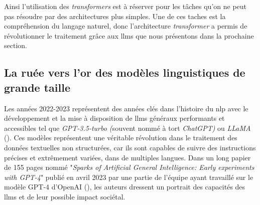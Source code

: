Ainsi l'utilisation des \textit{transformers} est à réserver pour les tâches qu'on ne peut pas résoudre par des architectures plus simples. Une de ces taches est la compréhension du langage naturel, donc l'architecture \textit{transformer} a permis de révolutionner le traitement grâce aux \gls{llms} que nous présentons dans la prochaine section.

\subsection{La ruée vers l'or des modèles linguistiques de grande taille}\label{chap2_llms}
Les années 2022-2023 représentent des années clés dans l’histoire du \gls{nlp} avec le développement et la mise à disposition de \gls{llms} généraux performants et accessibles tel que \textit{GPT-3.5-turbo (}souvent nommé à tort \textit{ChatGPT)} ou \textit{LLaMA} (\cite{touvron_llama_2023}).  Ces modèles représentent une véritable révolution dans le traitement des données textuelles non structurées, car ils sont capables de suivre des instructions précises et extrêmement variées, dans de multiples langues. Dans un long papier de 155 pages nommé "\textit{Sparks of Artificial General Intelligence: Early experiments with GPT-4}" publié en avril 2023 par une partie de l'équipe ayant travaillé sur le modèle GPT-4 d'OpenAI (\cite{bubeck_sparks_2023}), les auteurs dressent un portrait des capacités des \gls{llms} et de leur possible impact sociétal.


